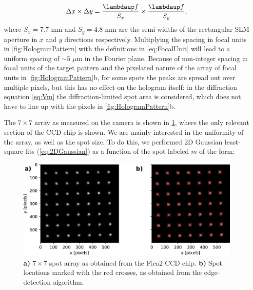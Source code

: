 \begin{equation}\label{eq:FocalUnit}
    \Delta x \times \Delta y = \frac{\lambdaup f}{S_x}\times \frac{\lambdaup f}{S_y},
\end{equation}
where $S_x = 7.7$ mm and $S_y = 4.8$ mm are the semi-widths of the rectangular SLM aperture in $x$ and $y$ directions respectively.
Multiplying the spacing in focal units in \cref{fig:HologramPattern} with the definitions in \cref{eq:FocalUnit} will lead to a uniform spacing of $\sim 5$ $\mu$m in the Fourier plane. 
Because of non-integer spacing in focal units of the target pattern and the pixelated nature of the array of focal units in \ref{fig:HologramPattern}b, for some spots the peaks are spread out over multiple pixels, but this has no effect on the hologram itself: in the diffraction equation \cref{eq:Vm} the diffraction-limited spot area is considered, which does not have to line up with the pixels in \cref{fig:HologramPattern}b.

The $7\times7$ array as measured on the camera is shown in \cref{fig:CameraLoG}, where the only relevant section of the CCD chip is shown. 
We are mainly interested in the uniformity of the array, as well as the spot size.
To do this, we performed 2D Gaussian least-square fits (\cref{eq:2DGaussian}) as a function of the spot labeled $m$ of the form:

\begin{figure}
    \centering
    \includegraphics[width=\textwidth]{figures/CamImgLoGSpots.pdf}
    \caption{\textsf{\textbf{a)}} $7\times7$ spot array as obtained from the Flea2 CCD chip.
    \textsf{\textbf{b)}} Spot locations marked with the red crosses, as obtained from the edge-detection algorithm. }
    \label{fig:CameraLoG}
\end{figure}

